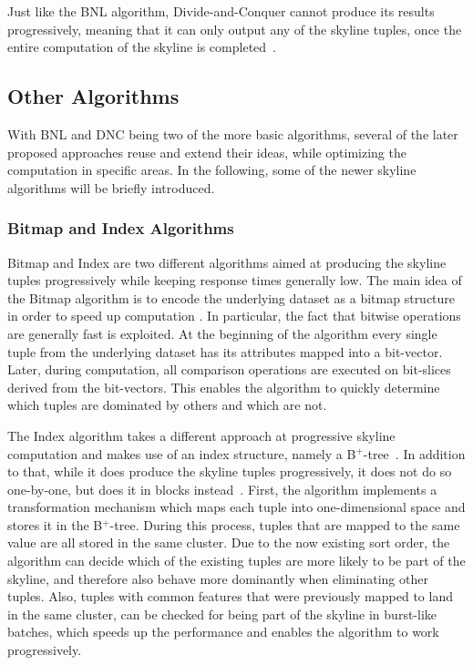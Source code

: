 Just like the BNL algorithm, Divide-and-Conquer cannot produce its results progressively, meaning that it can only output any of the skyline tuples, once the entire computation of the skyline is completed~\cite{survey}. 

\subsection{Other Algorithms}
With BNL and DNC being two of the more basic algorithms, several of the later proposed approaches reuse and extend their ideas, while optimizing the computation in specific areas. In the following, some of the newer skyline algorithms will be briefly introduced. 

\subsubsection{Bitmap and Index Algorithms} \label{subsection:bitmap-index}
Bitmap \cite{bitmap-index} and Index \cite{bitmap-index} are two different algorithms aimed at producing the skyline tuples progressively while keeping response times generally low. 
The main idea of the Bitmap algorithm is to encode the underlying dataset as a bitmap structure in order to speed up computation \cite{survey}. In particular, the fact that bitwise operations are generally fast is exploited. At the beginning of the algorithm every single tuple from the underlying dataset has its attributes mapped into a bit-vector. Later, during computation, all comparison operations are executed on bit-slices derived from the bit-vectors. This enables the algorithm to quickly determine which tuples are dominated by others and which are not. 

The Index algorithm takes a different approach at progressive skyline computation and makes use of an index structure, namely a B$^{+}$-tree~\cite{bitmap-index}. In addition to that, while it does produce the skyline tuples progressively, it does not do so one-by-one, but does it in blocks instead~\cite{survey}. First, the algorithm implements a transformation mechanism which maps each tuple into one-dimensional space and stores it in the B$^{+}$-tree. During this process, tuples that are mapped to the same value are all stored in the same cluster. Due to the now existing sort order, the algorithm can decide which of the existing tuples are more likely to be part of the skyline, and therefore also behave more dominantly when eliminating other tuples. Also, tuples with common features that were previously mapped to land in the same cluster, can be checked for being part of the skyline in burst-like batches, which speeds up the performance and enables the algorithm to work progressively. 

